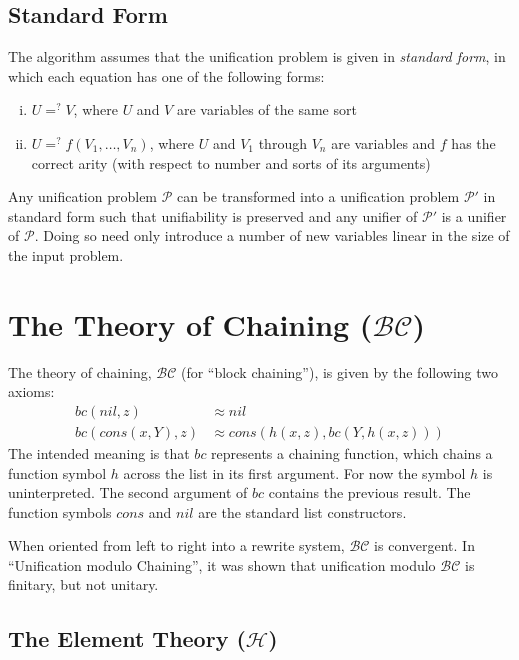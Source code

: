 \documentclass[11pt]{article}
\newcommand{\ueq}{=_{}^?}
\newcommand{\p}{\mathcal{P}}
\newcommand{\BC}{\mathcal{BC}}
\newcommand{\HH}{\mathcal{H}}
\newcommand{\Bc}{\mathit{bc}}
\newcommand{\Hh}{\mathit{h}}
\newcommand{\Cons}{\mathit{cons}}
\newcommand{\Nil}{\mathit{nil}}
\begin{document}
\subsection{Standard Form}\label{subsection:standard-form}

The algorithm assumes that the unification problem is given in \emph{standard form},
in which each equation has one of the following forms:
\begin{enumerate}[(i)]
    \item $U \ueq V$, where $U$ and $V$ are variables of the same sort
    \item $U \ueq f(V_1, \dotsc, V_n)$, where $U$ and $V_1$ through $V_n$ are
        variables and $f$ has the correct arity (with respect to number and sorts
        of its arguments)
\end{enumerate}
Any unification problem $\p$ can be transformed into a unification problem
$\p'$ in standard form such that unifiability is preserved and any unifier of
$\p'$ is a unifier of $\p$. Doing so need only introduce a number of new variables
linear in the size of the input problem.

\section{The Theory of Chaining (\texorpdfstring{$\BC$}{BC})}
\label{section:theory}

The theory of chaining, $\BC$ (for ``block chaining''), is given by the
following two axioms:
\begin{align*}
    \Bc(\Nil, z) &\approx \Nil \\
    \Bc(\Cons(x, Y), z) &\approx \Cons(\Hh(x, z), \Bc(Y, \Hh(x, z)))
\end{align*}
The intended meaning is that $\Bc$ represents a chaining function, which chains
a function symbol $\Hh$ across the list in its first argument. For now the
symbol $\Hh$ is uninterpreted. The second argument of $\Bc$ contains the
previous result. The function symbols $\Cons$ and $\Nil$ are the standard list
constructors.

When oriented from left to right into a rewrite system, $\BC$ is convergent.
In ``Unification modulo Chaining'', it was shown that unification modulo $\BC$
is finitary, but not unitary.

\subsection{The Element Theory (\texorpdfstring{$\HH$}{H})}
\label{subsection:element-theory}
\end{document}
